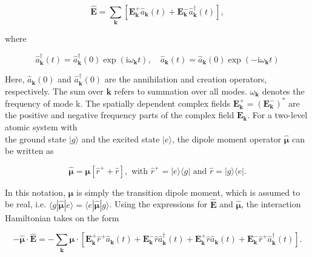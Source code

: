 \documentclass[10pt]{article}
\begin{document}
\begin{equation*}
\hat{\mathbf{E}}=\sum_{\mathbf{k}}\left[\mathbf{E}_{\mathbf{k}}^{+} \hat{a}_{\mathbf{k}}(t)+\mathbf{E}_{\mathbf{k}}^{-} \hat{a}_{\mathbf{k}}^{\dagger}(t)\right], \tag{8.91}
\end{equation*}


where


\begin{equation*}
\hat{a}_{\mathbf{k}}^{\dagger}(t)=\hat{a}_{\mathbf{k}}^{\dagger}(0) \exp \left(\mathrm{i} \omega_{\mathbf{k}} t\right), \quad \hat{a}_{\mathbf{k}}(t)=\hat{a}_{\mathbf{k}}(0) \exp \left(-\mathrm{i} \omega_{\mathbf{k}} t\right) \tag{8.92}
\end{equation*}


Here, $\hat{a}_{\mathbf{k}}(0)$ and $\hat{a}_{\mathbf{k}}^{\dagger}(0)$ are the annihilation and creation operators, respectively. The sum over $\mathbf{k}$ refers to summation over all modes. $\omega_{\mathbf{k}}$ denotes the frequency of mode k. The spatially dependent complex fields $\mathbf{E}_{\mathbf{k}}^{+}=\left(\mathbf{E}_{\mathbf{k}}^{-}\right)^{*}$ are the positive and negative frequency parts of the complex field $\mathbf{E}_{\mathbf{k}}$. For a two-level atomic system with\\
the ground state $|g\rangle$ and the excited state $|e\rangle$, the dipole moment operator $\hat{\boldsymbol{\mu}}$ can be written as


\begin{equation*}
\hat{\boldsymbol{\mu}}=\boldsymbol{\mu}\left[\hat{r}^{+}+\hat{r}\right], \text { with } \hat{r}^{+}=|e\rangle\langle g| \text { and } \hat{r}=|g\rangle\langle e| . \tag{8.93}
\end{equation*}


In this notation, $\boldsymbol{\mu}$ is simply the transition dipole moment, which is assumed to be real, i.e. $\langle g| \hat{\boldsymbol{\mu}}|e\rangle=\langle e| \hat{\boldsymbol{\mu}}|g\rangle$. Using the expressions for $\hat{\mathbf{E}}$ and $\hat{\boldsymbol{\mu}}$, the interaction Hamiltonian takes on the form


\begin{equation*}
-\hat{\boldsymbol{\mu}} \cdot \hat{\mathbf{E}}=-\sum_{\mathbf{k}} \boldsymbol{\mu} \cdot\left[\mathbf{E}_{\mathbf{k}}^{+} \hat{r}^{+} \hat{a}_{\mathbf{k}}(t)+\mathbf{E}_{\mathbf{k}}^{-} \hat{r} \hat{a}_{\mathbf{k}}^{\dagger}(t)+\mathbf{E}_{\mathbf{k}}^{+} \hat{r} \hat{a}_{\mathbf{k}}(t)+\mathbf{E}_{\mathbf{k}}^{-} \hat{r}^{+} \hat{a}_{\mathbf{k}}^{\dagger}(t)\right] . \tag{8.94}
\end{equation*}
\end{document}
